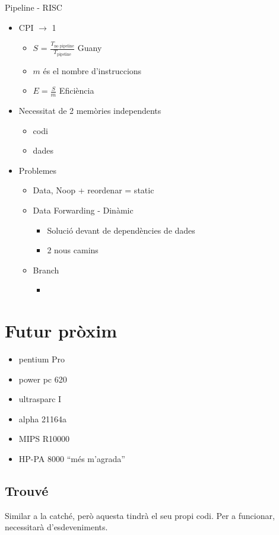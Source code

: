 \documentclass{article}
\begin{document}
Pipeline - RISC
\begin{itemize}
\item CPI $\to$ 1
	\begin{itemize}
	\item $S$ = $\frac{T_\text{no pipeline}}{T_\text{pipeline}}$ Guany
	\item $m$ és el nombre d'instruccions
	\item $E = \frac{S}{m}$ Eficiència
	\end{itemize}
\item Necessitat de 2 memòries independents
	\begin{itemize}
	\item codi
	\item dades
	\end{itemize}
\item Problemes
	\begin{itemize}
	\item Data, Noop + reordenar = static
	\item Data Forwarding - Dinàmic
		\begin{itemize}
		\item Solució devant de dependències de dades
		\item 2 nous camins
		\end{itemize}
	\item Branch
		\begin{itemize}
		\item 
		\end{itemize}
	\end{itemize}
\end{itemize}

\newpage
\section{Futur pròxim}
\begin{itemize}
\item pentium Pro
\item power pc 620
\item ultrasparc I
\item alpha 21164a
\item MIPS R10000
\item HP-PA 8000 ``més m'agrada''
\end{itemize}
\subsection{Trouvé}
Similar a la catché, però aquesta tindrà el seu propi codi. Per a funcionar, necessitarà d'esdeveniments.
\end{document}
